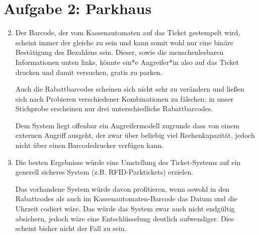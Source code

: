 \documentclass[a4paper,11pt,ngerman]{scrartcl}
\begin{document}
\section*{Aufgabe 2: Parkhaus}
  \begin{enumerate}[\bf 1.]
    \setcounter{enumi}{1}
    \item
      Der Barcode, der vom Kassenautomaten auf das Ticket gestempelt wird, scheint
      immer der gleiche zu sein und kann somit wohl nur eine binäre Bestätigung des
      Bezahlens sein. Dieser, sowie die menschenlesbaren Informationen unten links,
      könnte ein*e Angreifer*in also auf das Ticket drucken und damit versuchen, gratis
      zu parken.

      Auch die Rabattbarcodes scheinen sich nicht sehr zu verändern und ließen sich
      nach Probieren verschiedener Kombinationen zu fälschen; in unser Stichprobe
      erscheinen nur drei unterschiedliche Rabattbarcodes.

      Dem System liegt offenbar ein Angreifermodell zugrunde dass von einem externen
      Angriff ausgeht, der zwar über beliebig viel Rechenkapazität, jedoch nicht
      über einen Barcodedrucker verfügen kann.
    \item
      Die besten Ergebnisse würde eine Umstellung des Ticket-Systems auf ein generell
      sicheres System (z.B. RFID-Parktickets) erzielen.

      Das vorhandene System würde davon profitieren, wenn sowohl in den Rabattcodes
      als auch im Kassenautomaten-Barcode das Datum und die Uhrzeit codiert wäre.
      Das würde das System zwar auch nicht endgültig absichern, jedoch wäre eine
      Entschlüsselung deutlich aufwendiger. Dies scheint bisher nicht der Fall zu sein.
  \end{enumerate}
\end{document}

